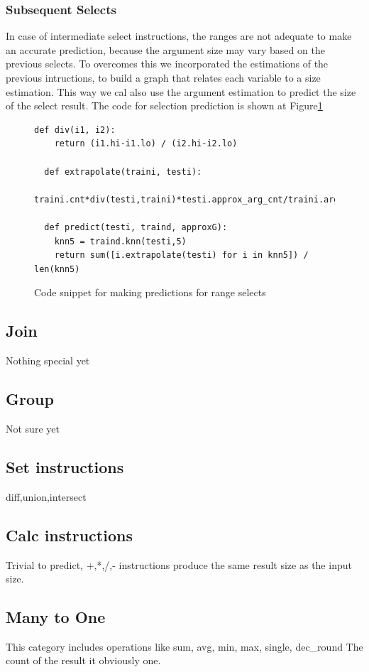 \documentclass{article}
\begin{document}
\subsubsection{Subsequent Selects}
In case of intermediate select instructions, the ranges are not adequate to
make an accurate prediction, because the argument size may vary based on the
previous selects. To overcomes this we incorporated the estimations of the
previous intructions, to build a graph that relates each variable to a size
estimation. This way we cal also use the argument estimation to predict the
size of the select result. The code for selection prediction is shown at
Figure\ref{sel:code}

\begin{figure}[t]
\begin{lstlisting}[frame=single]
  def div(i1, i2):
    return (i1.hi-i1.lo) / (i2.hi-i2.lo)

  def extrapolate(traini, testi):
      traini.cnt*div(testi,traini)*testi.approx_arg_cnt/traini.argcnt

  def predict(testi, traind, approxG):
    knn5 = traind.knn(testi,5)
    return sum([i.extrapolate(testi) for i in knn5]) / len(knn5)
\end{lstlisting}
  \caption{Code snippet for making predictions for range selects}
  \label{sel:code}
\end{figure}


\subsection{Join}
Nothing special yet

\subsection{Group}
Not sure yet

\subsection{Set instructions}
diff,union,intersect

\subsection{Calc instructions}
Trivial to predict,
+,*,/,- instructions produce the same result size as the input size.

\subsection{Many to One}
This category includes operations like sum, avg, min, max, single, dec\_round
The count of the result it obviously one.
\end{document}
